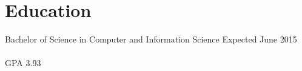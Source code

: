 \section*{Education}
\noindent
Bachelor of Science in Computer and Information Science
\hfill Expected June 2015 \\
\UO{} \\
GPA 3.93
